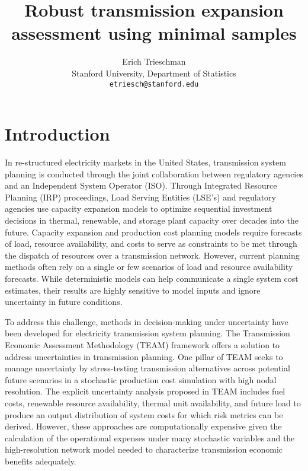 \documentclass[10pt,twocolumn,letterpaper]{article}
\begin{document}
\title{Robust transmission expansion assessment using minimal samples}

\author{Erich Trieschman\\
Stanford University, Department of Statistics\\
{\tt\small etriesch@stanford.edu}
}
\maketitle

\begin{abstract}
\end{abstract}
  

\section{Introduction}
\label{sec:intro}

In re-structured electricity markets in the United States, transmission system planning is conducted through the joint collaboration between regulatory agencies and an Independent System Operator (ISO)\cite{grid_lab_transmission_2023}. Through Integrated Resource Planning (IRP) proceedings, Load Serving Entities (LSE's) and regulatory agencies use capacity expansion models to optimize sequential investment decisions in thermal, renewable, and storage plant capacity over decades into the future\cite{hobbs_adaptive_2016}. Capacity expansion and production cost planning models require forecasts of load, resource availability, and costs to serve as constraints to be met through the dispatch of resources over a transmission network. However, current planning methods often rely on a single or few scenarios of load and resource availability forecasts. While deterministic models can help communicate a single system cost estimates, their results are highly sensitive to model inputs and ignore uncertainty in future conditions. 

To address this challenge, methods in decision-making under uncertainty have been developed for electricity transmission system planning. The Transmission Economic Assessment Methodology (TEAM)\cite{zhang_using_2010} framework offers a solution to address uncertainties in transmission planning. One pillar of TEAM seeks to manage uncertainty by stress-testing transmission alternatives across potential future scenarios in a stochastic production cost simulation with high nodal resolution. The explicit uncertainty analysis proposed in TEAM includes fuel costs, renewable resource availability, thermal unit availability, and future load to produce an output distribution of system costs for which risk metrics can be derived. However, these approaches are computationally expensive given the calculation of the operational expenses under many stochastic variables and the high-resolution network model needed to characterize transmission economic benefits adequately.
\end{document}
